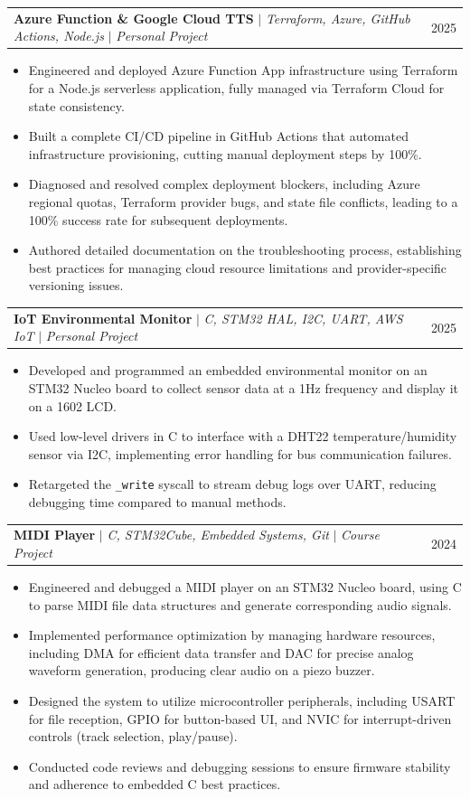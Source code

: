 \documentclass[letterpaper,11pt]{article}
\makeatletter
\newcommand{\resumeItem}[1]{
  \item\small{
    {#1 \vspace{-2pt}}
  }
}
\newcommand{\resumeProjectHeading}[2]{
    \item
    \begin{tabular*}{0.97\textwidth}{l@{\extracolsep{\fill}}r}
      \small#1 & #2 \\
    \end{tabular*}\vspace{-7pt}
}
\newcommand{\resumeItemListStart}{\begin{itemize}}
\newcommand{\resumeItemListEnd}{\end{itemize}\vspace{-5pt}}
\makeatother
\begin{document}
    \resumeProjectHeading
        {\textbf{Azure Function \& Google Cloud TTS} $|$ \emph{Terraform, Azure, GitHub Actions, Node.js} $|$ \emph{Personal Project}}{2025}
        \resumeItemListStart
            \resumeItem{Engineered and deployed Azure Function App infrastructure using Terraform for a Node.js serverless application, fully managed via Terraform Cloud for state consistency.}
            \resumeItem{Built a complete CI/CD pipeline in GitHub Actions that automated infrastructure provisioning, cutting manual deployment steps by 100\%.}
            \resumeItem{Diagnosed and resolved complex deployment blockers, including Azure regional quotas, Terraform provider bugs, and state file conflicts, leading to a 100\% success rate for subsequent deployments.}
            \resumeItem{Authored detailed documentation on the troubleshooting process, establishing best practices for managing cloud resource limitations and provider-specific versioning issues.}
        \resumeItemListEnd

    \resumeProjectHeading
        {\textbf{IoT Environmental Monitor} $|$ \emph{C, STM32 HAL, I2C, UART, AWS IoT} $|$ \emph{Personal Project}}{2025}
        \resumeItemListStart
          \resumeItem{Developed and programmed an embedded environmental monitor on an STM32 Nucleo board to collect sensor data at a 1Hz frequency and display it on a 1602 LCD.}
          \resumeItem{Used low-level drivers in C to interface with a DHT22 temperature/humidity sensor via I2C, implementing error handling for bus communication failures.}
          \resumeItem{Retargeted the \texttt{\_write} syscall to stream debug logs over UART, reducing debugging time compared to manual methods.}
        \resumeItemListEnd

    \resumeProjectHeading
        {\textbf{MIDI Player} $|$ \emph{C, STM32Cube, Embedded Systems, Git} $|$ \emph{Course Project}}{2024}
        \resumeItemListStart
            \resumeItem{Engineered and debugged a MIDI player on an STM32 Nucleo board, using C to parse MIDI file data structures and generate corresponding audio signals.}
            \resumeItem{Implemented performance optimization by managing hardware resources, including DMA for efficient data transfer and DAC for precise analog waveform generation, producing clear audio on a piezo buzzer.}
            \resumeItem{Designed the system to utilize microcontroller peripherals, including USART for file reception, GPIO for button-based UI, and NVIC for interrupt-driven controls (track selection, play/pause).}
            \resumeItem{Conducted code reviews and debugging sessions to ensure firmware stability and adherence to embedded C best practices.}
        \resumeItemListEnd
\end{document}
